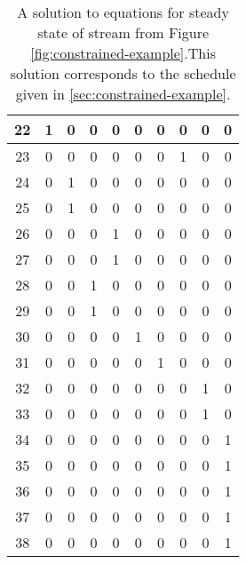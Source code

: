 \begin{table}
\begin{tabular}{|c|c|c|c|c|c|c|c|c|c|}
\hline 22                     & 1 & 0 & 0 & 0 & 0 & 0 & 0 & 0 & 0 \\
\hline 23                     & 0 & 0 & 0 & 0 & 0 & 0 & 1 & 0 & 0 \\
\hline 24                     & 0 & 1 & 0 & 0 & 0 & 0 & 0 & 0 & 0 \\
\hline 25                     & 0 & 1 & 0 & 0 & 0 & 0 & 0 & 0 & 0 \\
\hline 26                     & 0 & 0 & 0 & 1 & 0 & 0 & 0 & 0 & 0 \\
\hline 27                     & 0 & 0 & 0 & 1 & 0 & 0 & 0 & 0 & 0 \\
\hline 28                     & 0 & 0 & 1 & 0 & 0 & 0 & 0 & 0 & 0 \\
\hline 29                     & 0 & 0 & 1 & 0 & 0 & 0 & 0 & 0 & 0 \\
\hline 30                     & 0 & 0 & 0 & 0 & 1 & 0 & 0 & 0 & 0 \\
\hline 31                     & 0 & 0 & 0 & 0 & 0 & 1 & 0 & 0 & 0 \\
\hline 32                     & 0 & 0 & 0 & 0 & 0 & 0 & 0 & 1 & 0 \\
\hline 33                     & 0 & 0 & 0 & 0 & 0 & 0 & 0 & 1 & 0 \\
\hline 34                     & 0 & 0 & 0 & 0 & 0 & 0 & 0 & 0 & 1 \\
\hline 35                     & 0 & 0 & 0 & 0 & 0 & 0 & 0 & 0 & 1 \\
\hline 36                     & 0 & 0 & 0 & 0 & 0 & 0 & 0 & 0 & 1 \\
\hline 37                     & 0 & 0 & 0 & 0 & 0 & 0 & 0 & 0 & 1 \\
\hline 38                     & 0 & 0 & 0 & 0 & 0 & 0 & 0 & 0 & 1 \\
\hline
\end{tabular}
\caption[Sample solution to equations from Section
\ref{sec:constrained-example}]{A solution to equations for steady
state of stream from Figure \ref{fig:constrained-example}.This
solution corresponds to the schedule given in
\ref{sec:constrained-example}.} \label{tbl:const-lat-ss-sol}
\end{table}
